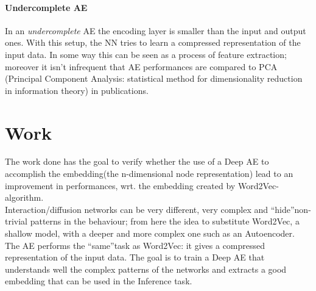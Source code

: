 \documentclass{article}
\begin{document}
			\paragraph{Undercomplete AE}
			In an \textit{undercomplete} AE the encoding layer is smaller than the input and output ones. With this setup, the NN tries to learn a compressed representation of the input data. In some way this can be seen as a process of feature extraction; moreover it isn't infrequent that AE performances are compared to PCA (Principal Component Analysis: statistical method for dimensionality reduction in information theory) in publications.
			\par \noindent \newline
			\begin{figure}[h!]
				\centerline{}
			\end{figure}
			\newpage
			
		\section{Work}
			The work done has the goal to verify whether the use of a Deep AE to accomplish the embedding(the n-dimensional node representation) lead to an improvement in performances, wrt. the embedding created by Word2Vec-algorithm.\\
			Interaction/diffusion networks can be very different, very complex and \textquotedblleft hide\textquotedblright non-trivial patterns in the behaviour; from here the idea to substitute Word2Vec, a shallow model, with a deeper and more complex one such as an Autoencoder. The AE performs the \textquotedblleft same\textquotedblright task as Word2Vec: it gives a compressed representation of the input data. The goal is to train a Deep AE that understands well the complex patterns of the networks and extracts a good embedding that can be used in the Inference task.
			
\end{document}
